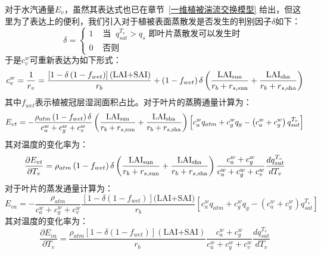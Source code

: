 对于水汽通量$E_{v}$，虽然其表达式也已在章节~\ref{一维植被湍流交换模型} 给出，但这里为了表达上的便利，我们引入对于植被表面蒸散发是否发生的判别因子$\delta$如下：
\begin{equation}
\delta=
\begin{cases}
 1 & \text { 当 }\ q_{s a t}^{T_{v}}>q_{s} \text { 即叶片蒸散发可以发生时 } \\ 
 0 & \text { 否则 }
 \end{cases}
\end{equation}
于是$c_v^w$可重新表达为如下形式：
\begin{equation}
c_{v}^{w}=\frac{1}{r_{v}}=\frac{\left[1-\delta\left(1-f_{wet}\right)\right](\text{LAI+SAI})}{r_{b}}+\left( 1 - f_{wet} \right)\delta\left( \frac{\rm LAI_{sun}}{r_{b} + r_{s,\rm sun}} + \frac{\rm LAI_{sha}}{r_{b} + r_{s,\rm sha}} \right)
\end{equation}
其中$f_{wet}$表示植被冠层湿润面积占比。对于叶片的蒸腾通量计算为：
\begin{equation}
E_{vt} = -\frac{\rho_{atm}\left(1-f_{w e t}\right)\delta }{c_{a}^{w}+c_{g}^{w}+c_{v}^{w}}\left( \frac{\rm LAI_{sun}}{r_{b} + r_{s,\rm sun}} + \frac{\rm LAI_{sha}}{r_{b} + r_{s,\rm sha}} \right) \left[c_{a}^{w} q_{atm}+c_{g}^{w} q_{g}-\left(c_{a}^{w}+c_{g}^{w}\right) q_{s a t}^{T_{v}}\right] 
\end{equation}
其对温度的变化率为：
\begin{equation}
\frac{\partial E_{vt}}{\partial T_{v}} = \rho_{atm} \left(1-f_{w e t}\right) \delta \left( \frac{\rm LAI_{sun}}{r_{b} + r_{s, \rm sun}} + \frac{\rm LAI_{sha}}{r_{b} + r_{s,\rm sha}} \right)\frac{c_{a}^{w}+c_{g}^{w}}{c_{a}^{w}+c_{g}^{w}+c_{v}^{w}} \frac{d q_{s a t}^{T_{v}}}{d T_{v}}
\end{equation}
对于叶片的蒸发通量计算为：
\begin{equation}
E_{va} = -\frac{\rho_{atm}}{c_{a}^{w}+c_{g}^{w}+c_{v}^{w}} \frac{\left[1-\delta\left(1-f_{w e t}\right)\right](\text {LAI+SAI)}}{r_{b}}\left[c_{a}^{w} q_{atm}+c_{g}^{w} q_{g}-\left(c_{a}^{w}+c_{g}^{w}\right) q_{sat}^{T_{v}}\right]
\end{equation}
其对温度的变化率为：
\begin{equation}
\frac{\partial E_{va}}{\partial T_{v}} = \frac{\rho_{atm}\left[1-\delta\left(1-f_{w e t}\right)\right](\text {LAI+SAI})}{r_{b}} \frac{c_{a}^{w}+c_{g}^{w}}{c_{a}^{w}+c_{g}^{w}+c_{v}^{w}} \frac{d q_{s a t}^{T_{v}}}{d T_{v}}
\end{equation}

